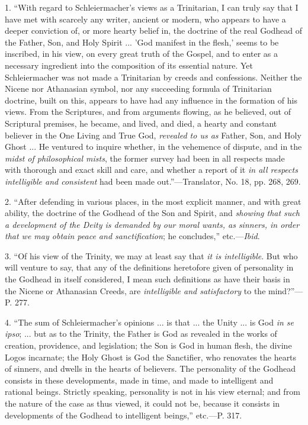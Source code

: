 1. ``With regard
to Schleiermacher's views as a Trinitarian, I can truly say that I
have met with scarcely any writer, ancient or modern, who appears to
have a deeper conviction of, or more hearty belief in, the doctrine of
the real Godhead of the Father, Son, and Holy Spirit ... 'God manifest
in the flesh,' seems to be inscribed, in his view, on every great
truth of the Gospel, and to enter as a necessary ingredient into the
composition of its essential nature. Yet Schleiermacher was not made a
Trinitarian by creeds and confessions. Neither the Nicene nor
Athanasian symbol, nor any succeeding formula of Trinitarian doctrine,
built on this, appears to have had any influence in the formation of
his views. From the Scriptures, and from arguments flowing, as he
believed, out of Scriptural premises, he became, and lived, and died,
a hearty and constant believer in the One Living and True God, \emph{revealed
to us as} Father, Son, and Holy Ghost ... He ventured to
inquire whether, in the vehemence of dispute, and in the \emph{midst of
philosophical mists}, the former survey had been in all respects
made with thorough and exact skill and care, and whether a report of
it \emph{in all respects intelligible and consistent} had been made
out.''—Translator, No. 18, pp. 268, 269.

2. ``After
defending in various places, in the most explicit manner, and with
great ability, the doctrine of the Godhead of the Son and Spirit, and \emph{showing
that such a development of the Deity is demanded by our moral wants,
as sinners, in order that we may obtain peace and sanctification};
he concludes,'' etc.—\emph{Ibid}.

3. ``Of his view
of the Trinity, we may at least say that \emph{it is intelligible}.
But who will venture to say, that any of the definitions heretofore
given of personality in the Godhead in itself considered, I mean such
definitions as have their basis in the Nicene or Athanasian Creeds,
are \emph{intelligible and satisfactory} to the mind?''—P. 277.

4. ``The sum of
Schleiermacher's opinions ... is that ... the Unity ... is God \emph{in
se ipso}; ... but as to the Trinity, the Father is God as revealed
in the works of creation, providence, and legislation; the Son is God
in human flesh, the divine Logos incarnate; the Holy Ghost is God the
Sanctifier, who renovates the hearts of sinners, and dwells in the
hearts of believers. The personality of the Godhead consists in these
developments, made in time, and made to intelligent and rational
beings. Strictly speaking, personality is not in his view eternal; and
from the nature of the case as thus viewed, it could not be, because
it consists in developments of the Godhead to intelligent beings,''
etc.—P. 317.

